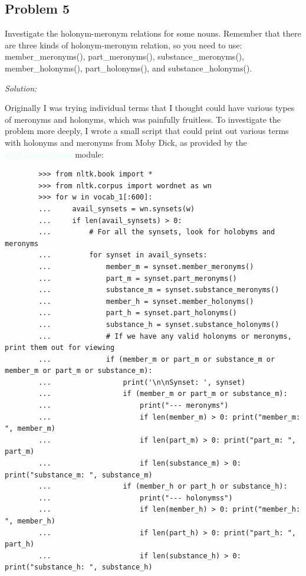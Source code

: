 \documentclass[11pt]{article}
\newenvironment{solution}{
	\vspace{10px}\noindent\emph{Solution:}
}{
	\vspace{10px}
}
\newcommand{\codeword}[1]{
	\texttt{\textcolor{lightCyan}{#1}}
}
\begin{document}
\subsection*{Problem 5}
Investigate the holonym-meronym relations for some nouns. Remember that there are three kinds of holonym-meronym relation, so you need to use: member\_meronyms(), part\_meronyms(),  substance\_meronyms(), member\_holonyms(), part\_holonyms(), and substance\_holonyms().

\begin{solution}
	Originally I was trying individual terms that I thought could have various types of meronyms and holonyms, which was painfully fruitless. To investigate the problem more deeply, I wrote a small script that could print out various terms with holonyms and meronyms from Moby Dick, as provided by the \codeword{nltk.corpus.book} module: 
	
	\begin{lstlisting}
		>>> from nltk.book import *
		>>> from nltk.corpus import wordnet as wn
		>>> for w in vocab_1[:600]:
		...     avail_synsets = wn.synsets(w)
		...     if len(avail_synsets) > 0:
		...         # For all the synsets, look for holobyms and meronyms
		...         for synset in avail_synsets:
		...             member_m = synset.member_meronyms()
		...             part_m = synset.part_meronyms()
		...             substance_m = synset.substance_meronyms()
		...             member_h = synset.member_holonyms()
		...             part_h = synset.part_holonyms()
		...             substance_h = synset.substance_holonyms()
		...             # If we have any valid holonyms or meronyms, print them out for viewing
		...             if (member_m or part_m or substance_m or member_m or part_m or substance_m):
		...                 print('\n\nSynset: ', synset)
		...                 if (member_m or part_m or substance_m):
		...                     print("--- meronyms")
		...                     if len(member_m) > 0: print("member_m: ", member_m)
		...                     if len(part_m) > 0: print("part_m: ", part_m)
		...                     if len(substance_m) > 0: print("substance_m: ", substance_m)
		...                 if (member_h or part_h or substance_h):
		...                     print("--- holonymss")
		...                     if len(member_h) > 0: print("member_h: ", member_h)
		...                     if len(part_h) > 0: print("part_h: ", part_h)
		...                     if len(substance_h) > 0: print("substance_h: ", substance_h)
			
			
	\end{lstlisting}
\end{solution}  
\end{document}
